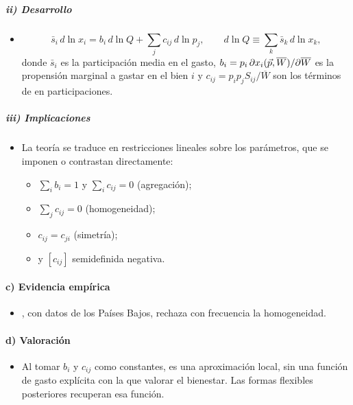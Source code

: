\documentclass[11pt]{article}
\begin{document}
\subparagraph{ii) Desarrollo}

\begin{itemize}
\item \begin{equation}
  \bar s_i\,d\ln x_i=b_i\,d\ln Q+\sum_jc_{ij}\,d\ln p_j,\qquad d\ln Q\equiv\sum_k\bar s_k\,d\ln x_k, \label{eq:rotterdam}
  \end{equation}
  donde $\bar s_i$ es la participación media en el gasto, $b_i=p_i\,\partial x_i(\vec{p},\overline{W})/\partial\overline{W}$ es la propensión marginal a gastar en el bien $i$ y $c_{ij}=p_ip_jS_{ij}/\overline{W}$ son los términos de  en participaciones.
\end{itemize}

\subparagraph{iii) Implicaciones}

\begin{itemize}
\item La teoría se traduce en restricciones lineales sobre los parámetros, que se imponen o contrastan directamente:
  \begin{itemize}
  \item $\sum_ib_i=1$ y $\sum_ic_{ij}=0$ (agregación);
  \item $\sum_jc_{ij}=0$ (homogeneidad);
  \item $c_{ij}=c_{ji}$ (simetría);
  \item y $[c_{ij}]$ semidefinida negativa.
  \end{itemize}
\end{itemize}

\paragraph{c) Evidencia empírica}

\begin{itemize}
\item \textcite{Barten1967Slutsky,Barten1969Maximum}, con datos de los Países Bajos, rechaza con frecuencia la homogeneidad.
\end{itemize}

\paragraph{d) Valoración}

\begin{itemize}
\item Al tomar $b_i$ y $c_{ij}$ como constantes, es una aproximación local, sin una función de gasto explícita con la que valorar el bienestar. Las formas flexibles posteriores recuperan esa función.
\end{itemize}
\end{document}
